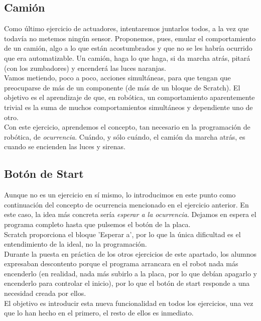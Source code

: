 \subsection{Camión}
Como último ejercicio de actuadores, intentaremos juntarlos todos, a la vez que todavía no metemos ningún sensor. Proponemos, pues, emular el comportamiento de un camión, algo a lo que están acostumbrados y que no se les habría ocurrido que era automatizable. Un camión, haga lo que haga, si da marcha atrás, pitará (con los zumbadores) y encenderá las luces naranjas. \\
Vamos metiendo, poco a poco, acciones simultáneas, para que tengan que preocuparse de más de un componente (de más de un bloque de Scratch). El objetivo es el aprendizaje de que, en robótica, un comportamiento aparentemente trivial es la suma de muchos comportamientos simultáneos y dependiente uno de otro.\\
Con este ejercicio, aprendemos el concepto, tan necesario en la programación de robótica, de \textit{ocurrencia}. Cuándo, y sólo cuándo, el camión da marcha atrás, es cuando se encienden las luces y sirenas.

\subsection{Botón de Start}
Aunque no es un ejercicio en sí mismo, lo introducimos en este punto como continuación del concepto de ocurrencia mencionado en el ejercicio anterior. En este caso, la idea más concreta sería \textit{esperar a la ocurrencia}. Dejamos en espera el programa completo hasta que pulsemos el botón de la placa.\\
Scratch proporciona el bloque 'Esperar a', por lo que la única dificultad es el entendimiento de la ideal, no la programación. \\
Durante la puesta en práctica de los otros ejercicios de este apartado, los alumnos expresaban descontento porque el programa arrancara en el robot nada más encenderlo (en realidad, nada más subirlo a la placa, por lo que debían apagarlo y encenderlo para controlar el inicio), por lo que el botón de start responde a una necesidad creada por ellos. \\
El objetivo es introducir esta nueva funcionalidad en todos los ejercicios, una vez que lo han hecho en el primero, el resto de ellos es inmediato.

